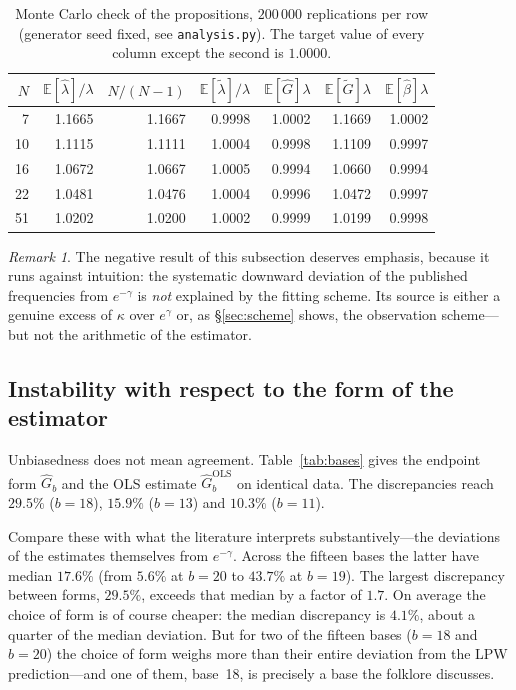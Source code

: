 \documentclass[11pt,a4paper]{article}
\theoremstyle{plain}
\theoremstyle{remark}
\newtheorem{remark}{Remark}
\newcommand{\eg}{e^{\gamma}}
\newcommand{\emg}{e^{-\gamma}}
\begin{document}
\begin{table}[t]
\centering
\caption{Monte Carlo check of the propositions, $200\,000$ replications per row
(generator seed fixed, see \texttt{analysis.py}). The target value of every
column except the second is $1.0000$.}
\label{tab:mc}
\small
\begin{tabular}{rrrrrrr}
\toprule
$N$ & $\mathbb E[\hat\lambda]/\lambda$ & $N/(N-1)$ & $\mathbb E[\tilde\lambda]/\lambda$
& $\mathbb E[\hat G]\lambda$ & $\mathbb E[\tilde G]\lambda$ & $\mathbb E[\hat\beta]\lambda$\\
\midrule
7 & 1.1665 & 1.1667 & 0.9998 & 1.0002 & 1.1669 & 1.0002\\
10 & 1.1115 & 1.1111 & 1.0004 & 0.9998 & 1.1109 & 0.9997\\
16 & 1.0672 & 1.0667 & 1.0005 & 0.9994 & 1.0660 & 0.9994\\
22 & 1.0481 & 1.0476 & 1.0004 & 0.9996 & 1.0472 & 0.9997\\
51 & 1.0202 & 1.0200 & 1.0002 & 0.9999 & 1.0199 & 0.9998\\
\bottomrule
\end{tabular}
\end{table}

\begin{remark}
The negative result of this subsection deserves emphasis, because it runs
against intuition: the systematic downward deviation of the published
frequencies from $\emg$ is \emph{not} explained by the fitting scheme. Its
source is either a genuine excess of $\kappa$ over $\eg$ or, as
\S\ref{sec:scheme} shows, the observation scheme---but not the arithmetic of the
estimator.
\end{remark}

\subsection{Instability with respect to the form of the estimator}\label{sec:instability}

Unbiasedness does not mean agreement. Table~\ref{tab:bases} gives the endpoint
form $\hat G_b$ and the OLS estimate $\hat G_b^{\mathrm{OLS}}$ on identical
data. The discrepancies reach $29.5\%$ ($b=18$), $15.9\%$ ($b=13$) and $10.3\%$
($b=11$).

Compare these with what the literature interprets substantively---the deviations
of the estimates themselves from $\emg$. Across the fifteen bases the latter
have median $17.6\%$ (from $5.6\%$ at $b=20$ to $43.7\%$ at $b=19$). The largest
discrepancy between forms, $29.5\%$, exceeds that median by a factor of $1.7$.
On average the choice of form is of course cheaper: the median discrepancy is
$4.1\%$, about a quarter of the median deviation. But for two of the fifteen
bases ($b=18$ and $b=20$) the choice of form weighs more than their entire
deviation from the LPW prediction---and one of them, base~18, is precisely a base
the folklore discusses.
\end{document}
